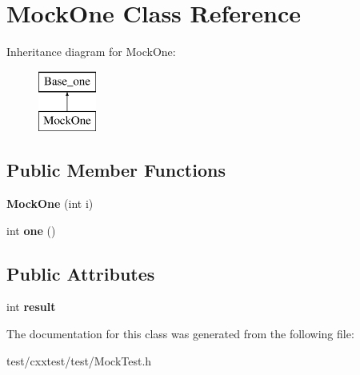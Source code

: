 \hypertarget{classMockOne}{\section{Mock\-One Class Reference}
\label{classMockOne}
}
Inheritance diagram for Mock\-One\-:\begin{figure}[H]
\begin{center}
\leavevmode
\includegraphics[height=2.000000cm]{classMockOne}
\end{center}
\end{figure}
\subsection*{Public Member Functions}
\begin{DoxyCompactItemize}
\item 
\hypertarget{classMockOne_ad4d1b8646cf3abe38afd457efc98f142}{{\bfseries Mock\-One} (int i)}\label{classMockOne_ad4d1b8646cf3abe38afd457efc98f142}

\item 
\hypertarget{classMockOne_aa35a437921c715197c9eaa557c71374b}{int {\bfseries one} ()}\label{classMockOne_aa35a437921c715197c9eaa557c71374b}

\end{DoxyCompactItemize}
\subsection*{Public Attributes}
\begin{DoxyCompactItemize}
\item 
\hypertarget{classMockOne_af1661e876ba30f2636339a4eec0a6149}{int {\bfseries result}}\label{classMockOne_af1661e876ba30f2636339a4eec0a6149}

\end{DoxyCompactItemize}


The documentation for this class was generated from the following file\-:\begin{DoxyCompactItemize}
\item 
test/cxxtest/test/Mock\-Test.\-h\end{DoxyCompactItemize}
